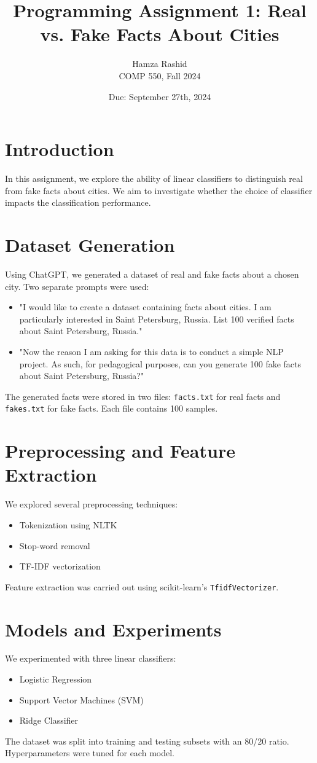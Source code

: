 \documentclass{article}
\title{Programming Assignment 1: Real vs. Fake Facts About Cities}
\author{Hamza Rashid \\
COMP 550, Fall 2024}
\date{Due: September 27th, 2024}
\begin{document}
\maketitle

\section{Introduction}
In this assignment, we explore the ability of linear classifiers to distinguish real from fake facts about cities. We aim to investigate whether the choice of classifier impacts the classification performance.

\section{Dataset Generation}
Using ChatGPT, we generated a dataset of real and fake facts about a chosen city. Two separate prompts were used:
\begin{itemize}
    \item "I would like to create a dataset containing facts about cities. 
    I am particularly interested in Saint Petersburg, Russia.
    List 100 verified facts about Saint Petersburg, Russia."
    \item "Now the reason I am asking for this data is to conduct a simple NLP project. 
    As such, for pedagogical purposes, can you generate 100 fake facts about Saint Petersburg, Russia?"
\end{itemize}
The generated facts were stored in two files: \texttt{facts.txt} for real facts and \texttt{fakes.txt} for fake facts. Each file contains 100 samples.

\section{Preprocessing and Feature Extraction}
We explored several preprocessing techniques:
\begin{itemize}
    \item Tokenization using NLTK
    \item Stop-word removal
    \item TF-IDF vectorization
\end{itemize}
Feature extraction was carried out using scikit-learn's \texttt{TfidfVectorizer}.

\section{Models and Experiments}
We experimented with three linear classifiers:
\begin{itemize}
    \item Logistic Regression
    \item Support Vector Machines (SVM)
    \item Ridge Classifier
\end{itemize}
The dataset was split into training and testing subsets with an 80/20 ratio. Hyperparameters were tuned for each model.
\end{document}
